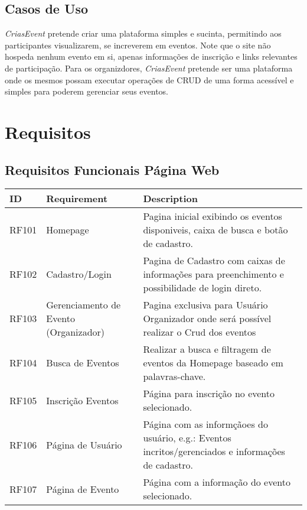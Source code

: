 \section{Casos de Uso}
	\textit{CriasEvent} pretende criar uma plataforma simples e sucinta, permitindo aos participantes visualizarem, se increverem em eventos. Note que o site não hospeda nenhum evento em si, apenas informações de inscrição e links relevantes de participação. Para os organizdores, \textit{CriasEvent} pretende ser uma plataforma onde os mesmos possam executar operações de CRUD de uma forma acessível e simples para poderem gerenciar seus eventos.


\chapter{Requisitos}
\label{Requisitos}

\section{Requisitos Funcionais Página Web}

\begin{tabular}{>{\raggedright}p{1.5cm}>{\raggedright}p{4cm}>{\raggedright}p{10cm}}
\toprule
\textbf{ID} & \textbf{Requirement} & \textbf{Description} \tabularnewline 
\midrule
  RF101 & Homepage & Pagina inicial exibindo os eventos disponiveis, caixa de busca e botão de cadastro.\tabularnewline \hline
  RF102 & Cadastro/Login & Pagina de Cadastro com caixas de informações para preenchimento e possibilidade de login direto.\tabularnewline \hline
  RF103 & Gerenciamento de Evento (Organizador) & Pagina exclusiva para Usuário Organizador onde será possível realizar o Crud dos eventos\tabularnewline \hline 
  RF104 & Busca de Eventos & Realizar a busca e filtragem de eventos da Homepage baseado em palavras-chave.\tabularnewline \hline
  RF105 & Inscrição Eventos & Página para inscrição no evento selecionado.\tabularnewline \hline
  RF106 & Página de Usuário & Página com as informçãoes do usuário, e.g.: Eventos incritos/gerenciados e informações de cadastro.\tabularnewline \hline
  RF107 & Página de Evento & Página com a informação do evento selecionado.\tabularnewline
\bottomrule
\end{tabular}

